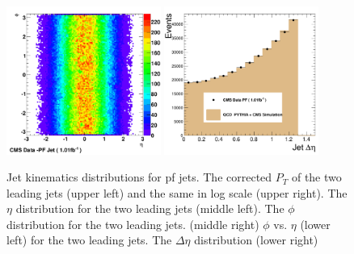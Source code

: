 \begin{figure}[!ht]
\begin{center}
    \includegraphics[width=0.45\textwidth]{Figures/c_Eta_Phi_Scatter_pf.pdf}
    \includegraphics[width=0.45\textwidth]{Figures/c_DEta_pf.pdf}

    \caption{ Jet kinematics distributions for pf jets.  The corrected $P_T$ of
      the two leading jets (upper left) and the same in log scale
      (upper right). The $\eta$ distribution for the two leading jets
      (middle left). The $\phi$ distribution for the two leading
      jets. (middle right) $\phi$ vs. $\eta$ (lower left) for the two
      leading jets. The $\Delta\eta$ distribution (lower right) }
    \label{jet_kinematics_pf}
  \end{center}
\end{figure}

